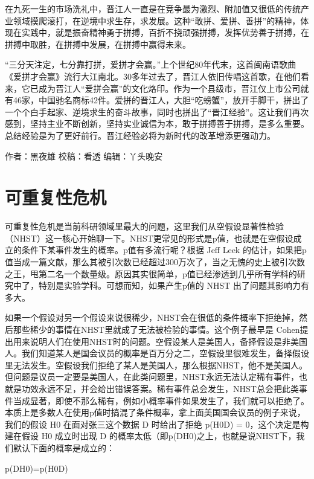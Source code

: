 \documentclass[]{book}
\begin{document}
在九死一生的市场洗礼中，晋江人一直是在竞争最为激烈、附加值又很低的传统产业领域摸爬滚打，在逆境中求生存，求发展。这种``敢拼、爱拼、善拼''的精神，体现在实践中，就是振奋精神勇于拼搏，百折不挠顽强拼搏，发挥优势善于拼搏，在拼搏中取胜，在拼搏中发展，在拼搏中赢得未来。

``三分天注定，七分靠打拼，爱拼才会赢。''上个世纪80年代末，这首闽南语歌曲《爱拼才会赢》流行大江南北。30多年过去了，晋江人依旧传唱这首歌，在他们看来，它已成为晋江人``爱拼会赢''的文化烙印。作为一个县级市，晋江仅上市公司就有46家，中国驰名商标42件。爱拼的晋江人，大胆``吃螃蟹''，放开手脚干，拼出了一个个白手起家、逆境求生的奋斗故事，同时也拼出了``晋江经验''。这让我们再次感到，坚持主业不断创新，坚持实业诚信为本，敢于拼搏善于拼搏，是多么重要。总结经验是为了更好前行。晋江经验必将为新时代的改革增添更强动力。

作者：黑夜雄
校稿：看透
编辑：丫头晚安

\hypertarget{ux53efux91cdux590dux6027ux5371ux673a}{%
\section{可重复性危机}\label{ux53efux91cdux590dux6027ux5371ux673a}}

可重复性危机是当前科研领域里最大的问题，这里我们从空假设显著性检验（NHST）这一核心开始聊一下。NHST更常见的形式是p值，也就是在空假设成立的条件下某事件发生的概率。p值有多流行呢？根据 Jeff Leek 的估计，如果把p值当成一篇文献，那么其被引次数已经超过300万次了，当之无愧的史上被引次数之王，甩第二名一个数量级。原因其实很简单，p值已经渗透到几乎所有学科的研究中了，特别是实验学科。可想而知，如果产生p值的 NHST 出了问题其影响力有多大。

如果一个假设对另一个假设来说很稀少，NHST会在很低的条件概率下拒绝掉，然后那些稀少的事情在NHST里就成了无法被检验的事情。这个例子最早是 Cohen提出用来说明人们在使用NHST时的问题。空假设某人是美国人，备择假设是非美国人。我们知道某人是国会议员的概率是百万分之二，空假设里很难发生，备择假设里无法发生。空假设我们拒绝了某人是美国人，那么根据NHST，他不是美国人。但问题是议员一定要是美国人，在此类问题里，NHST永远无法认定稀有事件，也就是功效永远不足，并会给出错误答案。稀有事件总会发生，NHST总会把此类事件当成显著，即使不那么稀有，例如小概率事件如果发生了，我们就可以拒绝了。本质上是多数人在使用p值时搞混了条件概率，拿上面美国国会议员的例子来说，我们的假设 H0 在面对张三这个数据 D 时给出了拒绝 p(H0\textbar{}D) = 0，这个决定是构建在假设 H0 成立时出现 D 的概率太低（即p(D\textbar{}H0)之上，也就是说NHST下，我们默认下面的概率是成立的：

p(D\textbar{}H0)=p(H0\textbar{}D)
\end{document}

